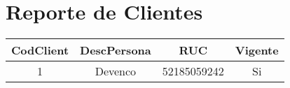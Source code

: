 \documentclass{article}
\begin{document}
\section{Reporte de Clientes}
\begin{tabular}{|c|c|c|c|}
\hline
CodClient & DescPersona & RUC & Vigente \\
\hline
1 & Devenco & 52185059242 & Si \\
\hline
\end{tabular}
\end{document}
